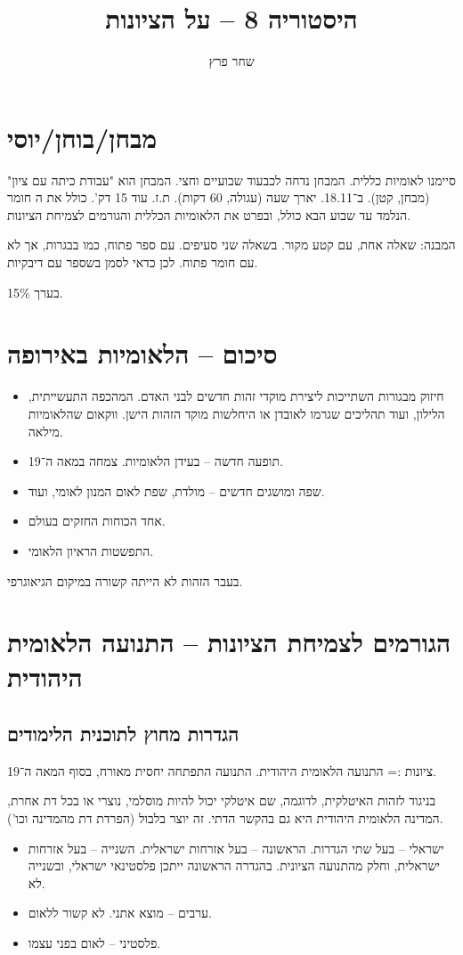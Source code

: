 \documentclass[]{article}
\author{שחר פרץ}
\title{היסטוריה 8 – על הציונות}
\begin{document}
	\maketitle
	\section{מבחן/בוחן/יוסי}
	סיימנו לאומיות כללית. המבחן נדחה לכבעוד שבועיים וחצי. המבחן הוא "עבודת כיתה עם ציון" (מבחן, קטן). ב־18.11. יארך שעה (עגולה, 60 דקות). ת.ז. עוד 15 דק'. כולל את ה חומר הנלמד עד שבוע הבא כולל, ובפרט את הלאומיות הכללית והגורמים לצמיחת הציונות.
	
	המבנה: שאלה אחת, עם קטע מקור. בשאלה שני סעיפים. עם ספר פתוח, כמו בבגרות, אך לא עם חומר פתוח. לכן כדאי לסמן בשספר עם דיבקיות. 
	
	בערך 15\%. 
	
	\section{סיכום – הלאומיות באירופה}
	\begin{itemize}
		\item חיזוק מבגורות השתייכות ליצירת מוקדי זהות חדשים לבני האדם. המהכפה התעשייתית, הלילון, ועוד תהליכים שגרמו לאובדן או היחלשות מוקד הזהות הישן. ווקאום שהלאומיות מילאה. 
		\item תופעה חדשה – בעידן הלאומיות. צמחה במאה ה־19. 
		\item שפה ומושגים חדשים – מולדת, שפת לאום המנון לאומי, ועוד. 
		\item אחד הכוחות החזקים בעולם. 
		\item התפשטות הראיון הלאומי. 
	\end{itemize}
	בעבר הזהות לא הייתה קשורה במיקום הגיאוגרפי. 
	\section{הגורמים לצמיחת הציונות – התנועה הלאומית היהודית}
	
	\subsection{הגדרות מחוץ לתוכנית הלימודים}
	ציונות := התנועה הלאומית היהודית. התנועה התפתחה יחסית מאורח, בסוף המאה ה־19. 
	
	בניגוד לזהות האיטלקית, לדוגמה, שם איטלקי יכול להיות מוסלמי, נוצרי או בכל דת אחרת, המדינה הלאומית היהודית היא גם בהקשר הדתי. זה יוצר בלבול (הפרדת דת מהמדינה וכו'). 
	
	\begin{itemize}
		\item ישראלי – בעל שתי הגדרות. הראשונה – בעל אזרחות ישראלית. השנייה – בעל אזרחות ישראלית, וחלק מהתנועה הציונית. בהגדרה הראשונה ייתכן פלסטינאי ישראלי, ובשנייה לא. 
		\item ערבים – מוצא אתני. לא קשור ללאום. 
		\item פלסטיני – לאום בפני עצמו. 
	\end{itemize}
	
\end{document}
